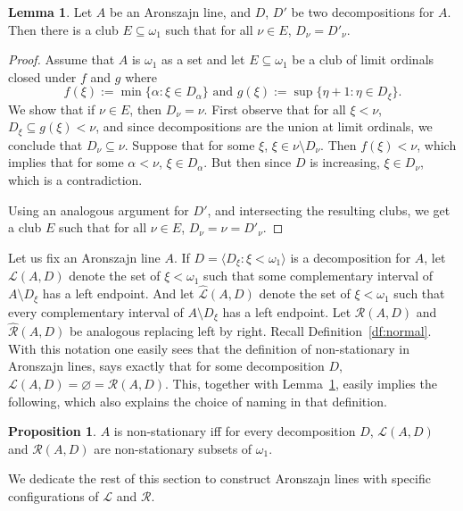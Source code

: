 \documentclass[10pt]{amsart}
\theoremstyle{definition}
\newtheorem{lemma}[theorem]{Lemma}
\newtheorem{proposition}[theorem]{Proposition}
\theoremstyle{remark}
\newcommand{\es}{\varnothing}
\newcommand{\seb}{\subseteq}
\newcommand{\setm}{\setminus}
\newcommand{\tup}[1]{\langle#1\rangle}
\renewcommand{\L}{\mathscr{L}}
\newcommand{\R}{\mathscr{R}}
\newcommand{\La}{\hat{\L}}
\newcommand{\Ra}{\hat{\R}}
\newcommand{\1}{\mathbbm{1}}
\begin{document}
\begin{lemma}\label{lem:dec-at-clubs}
  Let $A$ be an Aronszajn line, and $D$, $D'$ be two decompositions for $A$.
  Then there is a club $E \seb \omega_{1}$
  such that for all $\nu \in E$, $D_{\nu} = D'_{\nu}$.
\end{lemma}
\begin{proof}
  Assume that $A$ is $\omega_{1}$ as a set and let $E \seb \omega_{1}$
  be a club of limit ordinals closed under $f$ and $g$ where
  \[ f(\xi) := \min\{\alpha : \xi \in D_{\alpha}\}\text{ and }
    g(\xi) := \sup\{\eta + 1 : \eta \in D_{\xi}\}.\]
  We show that if $\nu \in E$, then $D_{\nu} = \nu$.
  First observe that for all $\xi < \nu$,
  $D_{\xi} \seb g(\xi) < \nu$, and since decompositions
  are the union at limit ordinals, we conclude that $D_{\nu} \seb \nu$.
  Suppose that for some $\xi$, $\xi \in \nu \setm D_{\nu}$.
  Then $f(\xi) < \nu$, which implies
  that for some $\alpha < \nu$, $\xi \in D_{\alpha}$. But
  then since $D$ is increasing, $\xi \in D_{\nu}$, which is
  a contradiction.

  Using an analogous argument for $D'$, and intersecting the resulting clubs,
  we get a club $E$ such that for all $\nu \in E$, $D_{\nu} = \nu = D'_{\nu}$.
\end{proof}


Let us fix an Aronszajn line $A$.
If $D = \tup{D_{\xi} : \xi < \omega_{1}}$ is a decomposition for
$A$, let $\L(A,D)$ denote the set of $\xi < \omega_{1}$ such that some
complementary interval of $A \setm D_{\xi}$ has a left endpoint. And
let $\La(A,D)$ denote the set of $\xi < \omega_{1}$ such that
every complementary interval of $A \setm D_{\xi}$ has a left endpoint.
Let $\R(A,D)$ and $\Ra(A,D)$ be analogous replacing left by right.
Recall Definition~\ref{df:normal}. With this notation one easily sees that the definition
of non-stationary in Aronszajn lines, says exactly that
for some decomposition $D$, $\L(A,D) = \es = \R(A,D)$. This, together
with Lemma~\ref{lem:dec-at-clubs}, easily implies the following, which also
explains the choice of naming in that definition.

\begin{proposition}\label{prop:nonstat-eq}
  $A$ is non-stationary iff for every decomposition $D$,
  $\L(A,D)$ and $\R(A,D)$ are non-stationary subsets of $\omega_{1}$.
\end{proposition}

We dedicate the rest of this section to construct Aronszajn lines
with specific configurations of $\L$ and $\R$.
\end{document}
